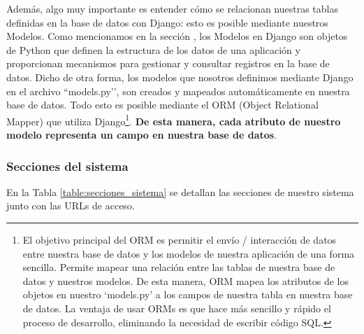 \documentclass[12pt,a4paper]{article}
\begin{document}
\begin{sloppypar}
Además, algo muy importante es entender cómo se relacionan nuestras tablas definidas en la base de datos con Django: esto es posible mediante nuestros Modelos. Como mencionamos en la sección \textit{}, los Modelos en Django son objetos de Python que definen la estructura de los datos de una aplicación y proporcionan mecanismos para gestionar y consultar registros en la base de datos. Dicho de otra forma, los modelos que nosotros definimos mediante Django en el archivo ``models.py’’, son creados y mapeados automáticamente en nuestra base de datos. Todo esto es posible mediante el ORM (Object Relational Mapper) que utiliza Django\footnote{El objetivo principal del ORM es permitir el envío / interacción de datos entre nuestra base de datos y los modelos de nuestra aplicación de una forma sencilla. Permite mapear una relación entre las tablas de nuestra base de datos y nuestros modelos. De esta manera, ORM mapea los atributos de los objetos en nuestro ‘models.py’ a los campos de nuestra tabla en nuestra base de datos. La ventaja de usar ORMs es que hace más sencillo y rápido el proceso de desarrollo, eliminando la necesidad de escribir código SQL.}. \textbf{De esta manera, cada atributo de nuestro modelo representa un campo en nuestra base de datos}. 

\subsubsection{Secciones del sistema}

En la Tabla \ref{table:secciones_sistema} se detallan las secciones de nuestro sistema junto con las URLs de acceso.


\end{sloppypar}
\end{document}
